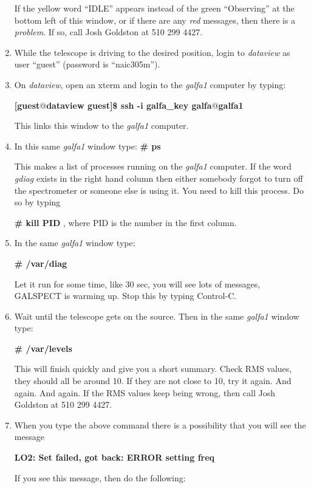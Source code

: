 \begin{enumerate}
	If the yellow word ``IDLE'' appears instead of the green
``Observing'' at the bottom left of this window, or if there are any
{\it red} messages, then there is a {\it problem}.  If so, call Josh
Goldston at 510 299 4427. 

\item While the telescope is driving to the desired position, login to
{\it dataview} as user ``guest'' (password is ``naic305m''). 

\item On {\it dataview}, open an xterm and login to the {\it galfa1}
computer by typing:

{\bf
[guest$@$dataview guest]\$  ssh -i galfa\_key galfa$@$galfa1 
}

This links this window to the {\it galfa1} computer.

\item In this same {\it galfa1} window type:
{\bf \# ps }

This makes a list of processes running on the {\it galfa1} computer.  If
the word {\it gdiag} exists in the right hand column then either
somebody forgot to turn off the spectrometer or someone else is using
it. You need to kill this process. Do so by typing

{\bf \# kill PID }, where PID is the number in the first column.

\item In the same {\it galfa1} window type:

{\bf \# /var/diag }

Let it run for some time, like 30 sec, you will see lots of messages,
GALSPECT is warming up. Stop this by typing Control-C.

\item Wait until the telescope gets on the source.  Then in the same
{\it galfa1} window type:

{\bf \# /var/levels }

This will finish quickly and give you a short summary.  Check RMS
values, they should all be around 10.  If they are not close to 10, try
it again.  And again.  And again.  If the RMS values keep being wrong,
then call Josh Goldston at 510 299 4427. 

	\item When you type the above command there is a possibility that
you will see the message

{\bf LO2: Set failed, got back: ERROR setting freq}

If you see this message, then do the following: \begin{enumerate}


\end{enumerate}
\end{enumerate}
